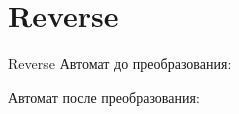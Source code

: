 \section{Reverse}
\begin{frame}{Reverse}
	Автомат до преобразования:


	Автомат после преобразования:


\end{frame}
